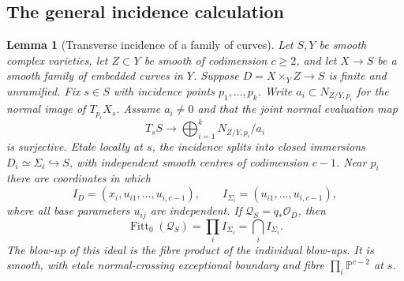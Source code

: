 \documentclass[11pt,reqno]{amsart}
\numberwithin{equation}{section}
\newtheorem{lemma}[theorem]{Lemma}
\theoremstyle{definition}\newtheorem{definition}[theorem]{Definition}
\theoremstyle{remark}\newtheorem{remark}[theorem]{Remark}
\newcommand{\Pj}{\mathbb P}\newcommand{\A}{\mathbb A}
\newcommand{\OO}{\mathcal O}\newcommand{\II}{\mathcal I}
\DeclareMathOperator{\Fitt}{Fitt}\DeclareMathOperator{\Ann}{Ann}
\begin{document}
\subsection{The general incidence calculation}
\begin{lemma}[Transverse incidence of a family of curves]
\label{lem:general-incidence-v161}
Let $S,Y$ be smooth complex varieties, let $Z\subset Y$ be smooth of
codimension $c\geq2$, and let $X\to S$ be a smooth family of embedded
curves in $Y$. Suppose $D=X\times_Y Z\to S$ is finite and unramified.
Fix $s\in S$ with incidence points $p_1,\ldots,p_k$. Write
$a_i\subset N_{Z/Y,p_i}$ for the normal image of $T_{p_i}X_s$.
Assume $a_i\ne0$ and that the joint normal evaluation map
\[
 T_sS\longrightarrow\bigoplus_{i=1}^k N_{Z/Y,p_i}/a_i
\]
is surjective. Etale locally at $s$, the incidence splits into closed
immersions $D_i\simeq\Sigma_i\hookrightarrow S$, with independent
smooth centres of codimension $c-1$. Near $p_i$ there are coordinates
in which
\begin{equation}\label{eq:general-normal-v161}
 I_D=(x_i,u_{i1},\ldots,u_{i,c-1}),\qquad
 I_{\Sigma_i}=(u_{i1},\ldots,u_{i,c-1}),
\end{equation}
where all base parameters $u_{ij}$ are independent. If
$\mathcal Q_S=q_*\OO_D$, then
\[
 \Fitt_0(\mathcal Q_S)=\prod_i I_{\Sigma_i}
                       =\bigcap_i I_{\Sigma_i}.
\]
The blow-up of this ideal is the fibre product of the individual
blow-ups. It is smooth, with etale normal-crossing exceptional boundary
and fibre $\prod_i\Pj^{c-2}$ at $s$.
\end{lemma}
\end{document}
